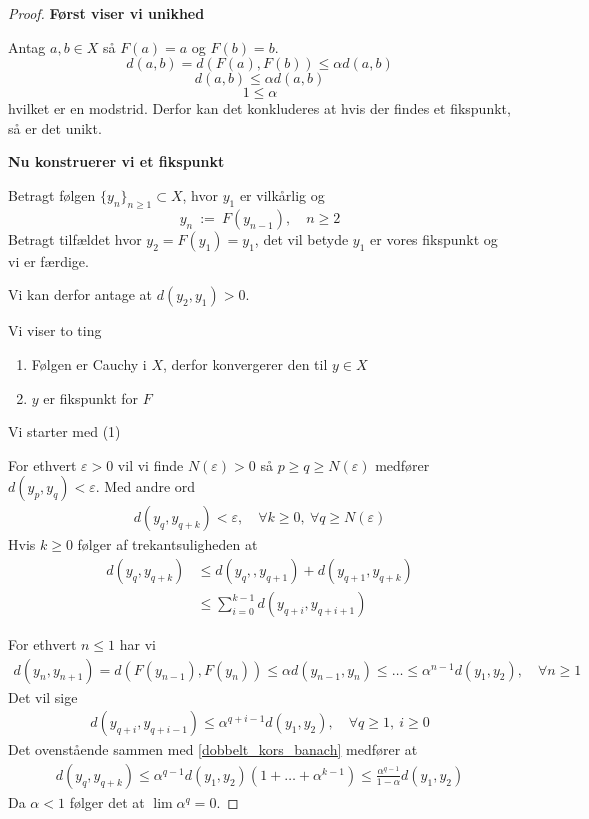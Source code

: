 \begin{proof}
  \textbf{Først viser vi unikhed}

  Antag $a,b \in X$ så $F(a) = a$ og $F(b) = b$.
  $$d(a,b) = d(F(a), F(b)) \leq \alpha d(a,b)$$
  $$d(a,b) \leq \alpha d(a,b)$$
  $$1 \leq \alpha$$
  hvilket er en modstrid. Derfor kan det konkluderes at hvis der findes et fikspunkt, så er det unikt.

  \textbf{Nu konstruerer vi et fikspunkt}

  Betragt følgen $ \{ y_n \}_{n \geq 1} \subset X$, hvor $y_1$ er vilkårlig og
  $$y_n \ := \ F(y_{n - 1}), \quad n \geq 2$$
  Betragt tilfældet hvor $y_2 = F(y_1) = y_1$, det vil betyde $y_1$ er vores fikspunkt og vi er færdige.

  Vi kan derfor antage at $d(y_2, y_1) > 0$.

  Vi viser to ting
  \begin{enumerate}[label = (\arabic*)]
    \item Følgen er Cauchy i $X$, derfor konvergerer den til $y \in X$
    \item $y$ er fikspunkt for $F$
  \end{enumerate}
  Vi starter med (1)

  For ethvert $\varepsilon > 0$ vil vi finde $N(\varepsilon) > 0$ så $ p \geq q \geq N(\varepsilon)$ medfører $d(y_p, y_q) < \varepsilon$.
  Med andre ord
  \begin{align}\label{kors_banach}
    d(y_q, y_{q + k}) < \varepsilon, \quad \forall k \geq 0, \ \forall q \geq N(\varepsilon)
  \end{align}
  Hvis $k \geq 0$ følger af trekantsuligheden at
  \begin{align}
    d(y_q, y_{q + k}) &\leq d(y_q,, y_{q + 1}) + d(y_{q + 1}, y_{q + k})\nonumber\\
    &\leq \sum_{i = 0}^{k - 1} d(y_{q + i}, y_{q + i + 1})\label{dobbelt_kors_banach}
  \end{align}

  For ethvert $n \leq 1$ har vi
  \begin{align*}
    d(y_n, y_{n + 1}) = d(F(y_{n - 1}), F(y_n)) \leq \alpha d(y_{n - 1}, y_n)
    \leq \ldots \leq \alpha^{n - 1} d(y_1, y_2), \quad \forall n \geq 1
  \end{align*}
  Det vil sige
  \begin{align*}
    d(y_{q + i}, y_{q + i - 1}) \leq \alpha^{q + i - 1} d(y_1, y_2), \quad \forall q \geq 1, \ i \geq 0
  \end{align*}
  Det ovenstående sammen med \eqref{dobbelt_kors_banach} medfører at
  \begin{align*}
    d(y_q, y_{q + k}) \leq \alpha^{q - 1} d(y_1, y_2) (1 + \ldots + \alpha^{k - 1}) \leq \frac{\alpha^{q - 1}}{1 - \alpha} d(y_1, y_2)
  \end{align*}
  Da $\alpha < 1$ følger det at $\lim \alpha^q = 0$.


\end{proof}
